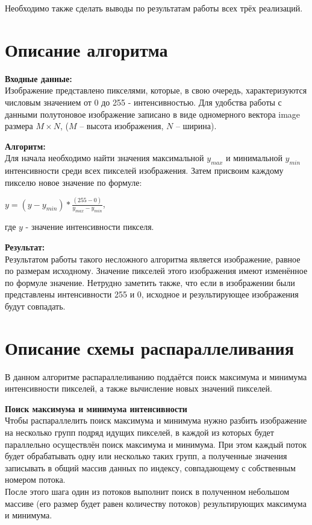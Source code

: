 \documentclass[14pt, russian]{extarticle}
\begin{document}
	Необходимо также сделать выводы по результатам работы всех трёх реализаций.
	
	\newpage

	\section{Описание алгоритма}
	\noindent\textbf{Входные данные:}\\
	\indent  Изображение представлено пикселями, которые, в свою очередь, характеризуются числовым значением от 0 до 255 - интенсивностью. Для удобства работы с данными полутоновое изображение записано в виде одномерного вектора image размера $ M \times N $, ($ M $ – высота изображения, $ N $ – ширина).
	
	\noindent\textbf{Алгоритм:}\\
	\indent Для начала необходимо найти значения максимальной $y_{max}$ и минимальной $y_{min}$ интенсивности среди всех пикселей изображения. Затем присвоим каждому пикселю новое значение по формуле:
    \begin{center}
    $ y = (y - y_{min}) * \frac{(255 - 0)}{y_{max} - y_{min}}$,\\
    \end{center}
    \indent где $y$ - значение интенсивности пикселя.
    
	\noindent\textbf{Результат:}\\
	\indent Результатом работы такого несложного алгоритма является изображение, равное по размерам исходному. Значение пикселей этого изображения имеют изменённое по формуле значение. Нетрудно заметить также, что если в изображении были представлены интенсивности 255 и 0, исходное и результирующее изображения будут совпадать. \newpage
	
	\section{Описание схемы распараллеливания}
	В данном алгоритме распараллеливанию поддаётся поиск максимума и минимума интенсивности пикселей, а также вычисление новых значений пикселей.

	\noindent\textbf{Поиск максимума и минимума интенсивности}\\
	\indent Чтобы распараллелить поиск максимума и минимума нужно разбить изображение на несколько групп подряд идущих пикселей, в каждой из которых будет параллельно осуществлён поиск максимума и минимума. При этом каждый поток будет обрабатывать одну или несколько таких групп, а полученные значения записывать в общий массив данных по индексу, совпадающему с собственным номером потока.\\
	\indent После этого шага один из потоков выполнит поиск в полученном небольшом массиве (его размер будет равен количеству потоков) результирующих максимума и минимума.
	
\end{document}
